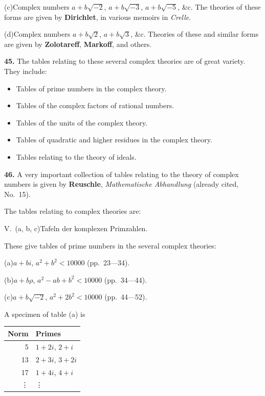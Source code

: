 \documentclass[11pt,a4paper]{article}
\begin{document}
\quad(c)\quad Complex numbers $a + b\sqrt{-2}$, $a + b\sqrt{-3}$, $a + b\sqrt{-5}$, \&c.
The theories of these forms are given by
\quad\textbf{Dirichlet}, in various memoirs in \textit{Crelle}.

\quad(d)\quad Complex numbers $a + b\sqrt{2}$, $a + b\sqrt{3}$, \&c.
Theories of these and similar forms are given by
\quad\textbf{Zolotareff}, \textbf{Markoff}, and others.

\textbf{45.} The tables relating to these several complex theories are of great variety.
They include:
\begin{itemize}
\item Tables of prime numbers in the complex theory.
\item Tables of the complex factors of rational numbers.
\item Tables of the units of the complex theory.
\item Tables of quadratic and higher residues in the complex theory.
\item Tables relating to the theory of ideals.
\end{itemize}

\textbf{46.} A very important collection of tables relating to the theory of complex numbers
is given by
\quad\textbf{Reuschle}, \textit{Mathematische Abhandlung} (already cited, No.\ 15).

The tables relating to complex theories are:

\quad V.\ (a, b, c)\quad Tafeln der komplexen Primzahlen.

These give tables of prime numbers in the several complex theories:

\quad(a)\quad $a + bi$, $a^{2} + b^{2} < 10000$ (pp.\ 23---34).

\quad(b)\quad $a + b\rho$, $a^{2} - ab + b^{2} < 10000$ (pp.\ 34---44).

\quad(c)\quad $a + b\sqrt{-2}$, $a^{2} + 2b^{2} < 10000$ (pp.\ 44---52).

A specimen of table (a) is
\begin{center}\begin{tabular}{r|l}
Norm & Primes \\
\hline
5 & $1 + 2i$, $2 + i$ \\
13 & $2 + 3i$, $3 + 2i$ \\
17 & $1 + 4i$, $4 + i$ \\
\vdots & \vdots \\
\end{tabular}\end{center}
\end{document}
